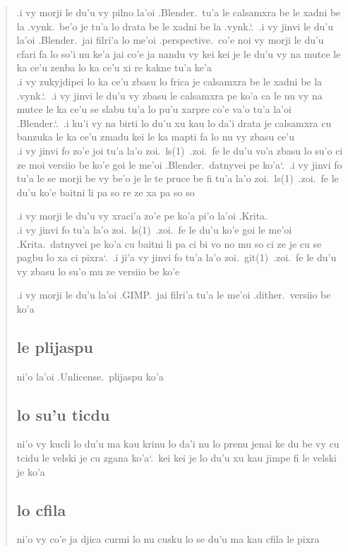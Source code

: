 \documentclass{report}
\newcommand\sds{\spacefactor\sfcode`.\ \space}
\begin{document}
\begin{quote}
	.i vy morji le du'u vy pilno la'oi .Blender.\ tu'a le calsamxra be le xadni be la .vynk.\ be'o je tu'a lo drata be le xadni be la .vynk.\sds  .i vy jinvi le du'u la'oi .Blender.\ jai filri'a lo me'oi .perspective.\ co'e noi vy morji le du'u cfari fa lo so'i nu ke'a jai co'e ja nandu vy kei kei je le du'u vy na mutce le ka ce'u zenba lo ka ce'u xi re kakne tu'a ke'a\\
	.i vy zukyjdipei lo ka ce'u zbasu lo frica je calsamxra be le xadni be la .vynk.\sds  .i vy jinvi le du'u vy zbasu le calsamxra pe ko'a ca le nu vy na mutce le ka ce'u se slabu tu'a lo pu'u xarpre co'e va'o tu'a la'oi .Blender.\sds  .i ku'i vy na birti lo du'u xu kau lo da'i drata je calsamxra cu banzuka le ka ce'u zmadu kei le ka mapti fa lo nu vy zbasu ce'u\\
	.i vy jinvi fo zo'e joi tu'a la'o zoi.\ ls(1)\ .zoi.\ fe le du'u vo'a zbasu lo su'o ci ze moi versiio be ko'e goi le me'oi .Blender.\ datnyvei pe ko'a\sds  .i vy jinvi fo tu'a le se morji be vy be'o je le te pruce be fi tu'a la'o zoi.\ ls(1)\ .zoi.\ fe le du'u ko'e baitni li pa so re ze xa pa so so

	.i vy morji le du'u vy xraci'a zo'e pe ko'a pi'o la'oi .Krita.\\
	.i vy jinvi fo tu'a la'o zoi.\ ls(1)\ .zoi.\ fe le du'u ko'e goi le me'oi .Krita.\ datnyvei pe ko'a cu baitni li pa ci bi vo no mu so ci ze je cu se pagbu lo xa ci pixra\sds  .i ji'a vy jinvi fo tu'a la'o zoi.\ git(1)\ .zoi.\ fe le du'u vy zbasu lo su'o mu ze versiio be ko'e

	.i vy morji le du'u la'oi .GIMP.\ jai filri'a tu'a le me'oi .dither.\ versiio be ko'a

	\subsection{le plijaspu}
	ni'o la'oi .Unlicense.\ plijaspu ko'a

	\subsection{lo su'u ticdu}
	ni'o vy kucli lo du'u ma kau krinu lo da'i nu lo prenu jenai ke du be vy cu tcidu le velski je cu zgana ko'a\sds kei kei je lo du'u xu kau jimpe fi le velski je ko'a

	\subsection{lo cfila}
	ni'o vy co'e ja djica curmi lo nu cusku lo se du'u ma kau cfila le pixra
\end{quote}
\end{document}
